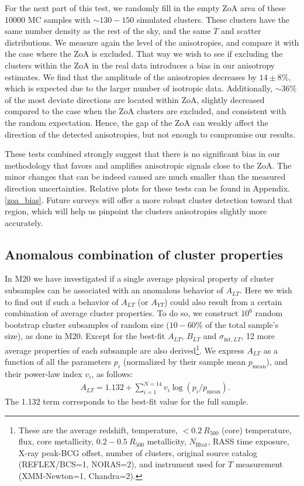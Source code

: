 \documentclass{aa}   %
\newcommand{\nhtot}{$N_{\text{Htot}}$}
\begin{document}
For the next part of this test, we randomly fill in the empty ZoA area of these 10000 MC samples with $\sim 130-150$ simulated clusters. These clusters have the same number density as the rest of the sky, and the same $T$ and scatter distributions. We measure again the level of the anisotropies, and compare it with the case where the ZoA is excluded. That way we wish to see if excluding the clusters within the ZoA in the real data introduces a bias in our anisotropy estimates. We find that the amplitude of the anisotropies decreases by $14\pm 8\%$, which is expected due to the larger number of isotropic data. Additionally, $\sim 36\%$ of the most deviate directions are located within ZoA, slightly decreased compared to the case when the ZoA clusters are excluded, and consistent with the random expectation. Hence, the gap of the ZoA can weakly affect the direction of the detected anisotropies, but not enough to compromise our results.

These tests combined strongly suggest that there is no significant bias in our methodology that favors and amplifies anisotropic signals close to the ZoA. The minor changes that can be indeed caused are much smaller than the measured direction uncertainties. Relative plots for these tests can be found in Appendix. \ref{zoa_bias}. Future surveys will offer a more robust cluster detection toward that region, which will help us pinpoint the clusters anisotropies slightly more accurately.

\subsection{Anomalous combination of cluster properties}\label{prop-comb}

In M20 we have investigated if a single average physical property of cluster subsamples can be associated with an anomalous behavior of $A_{LT}$. Here we wish to find out if such a behavior of $A_{LT}$ (or $A_{YT}$) could also result from a certain combination of average cluster properties. To do so, we construct $10^6$ random bootstrap cluster subsamples of random size ($10-60\%$ of the total sample's size), as done in M20. Except for the best-fit $A_{LT}$, $B_{LT}$ and $\sigma_{\text{int},LT}$, 12 more average properties of each subsample are also derived\footnote{These are the average redshift, temperature, $<0.2\ R_{500}$ (core) temperature, flux, core metallicity, $0.2-0.5\ R_{500}$ metallicity, \nhtot, RASS time exposure, X-ray peak-BCG offset, number of clusters, original source catalog (REFLEX/BCS=1, NORAS=2), and instrument used for $T$ measurement (XMM-Newton=1, Chandra=2).}. We express $A_{LT}$ as a function of all the parameters $p_i$ (normalized by their sample mean $p_{\text{mean}}$), and their power-law index $v_i$, as follows:
\begin{equation}
\begin{aligned}
&A_{LT}=1.132+ \sum_{i=1}^{N=14} v_i \log{\left(p_i/p_{\text{mean}}\right)}.
\label{ALT-pred}
\end{aligned}
\end{equation}
The 1.132 term corresponds to the best-fit value for the full sample. 
\end{document}
